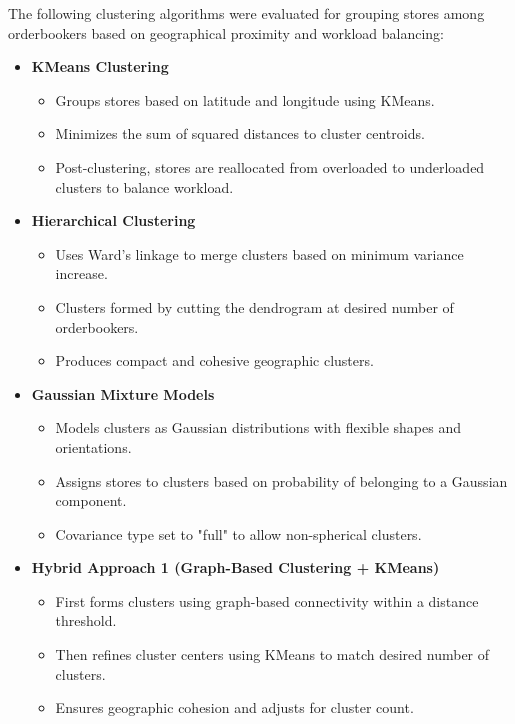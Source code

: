 The following clustering algorithms were evaluated for grouping stores among orderbookers based on geographical proximity and workload balancing:

\begin{itemize}
    \item \textbf{KMeans Clustering}
    \begin{itemize}
        \item Groups stores based on latitude and longitude using KMeans.
        \item Minimizes the sum of squared distances to cluster centroids.
        \item Post-clustering, stores are reallocated from overloaded to underloaded clusters to balance workload.
    \end{itemize}
    
    \item \textbf{Hierarchical Clustering}
    \begin{itemize}
        \item Uses Ward's linkage to merge clusters based on minimum variance increase.
        \item Clusters formed by cutting the dendrogram at desired number of orderbookers.
        \item Produces compact and cohesive geographic clusters.
    \end{itemize}
    
    \item \textbf{Gaussian Mixture Models}
    \begin{itemize}
        \item Models clusters as Gaussian distributions with flexible shapes and orientations.
        \item Assigns stores to clusters based on probability of belonging to a Gaussian component.
        \item Covariance type set to "full" to allow non-spherical clusters.
    \end{itemize}

    \item \textbf{Hybrid Approach 1 (Graph-Based Clustering + KMeans)}
    \begin{itemize}
        \item First forms clusters using graph-based connectivity within a distance threshold.%
        \item Then refines cluster centers using KMeans to match desired number of clusters.
        \item Ensures geographic cohesion and adjusts for cluster count.
    \end{itemize}


\end{itemize}
